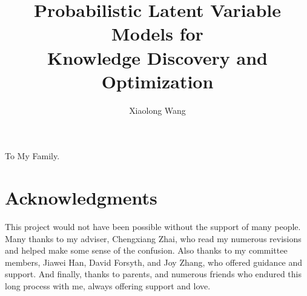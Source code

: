 \documentclass[edeposit,fullpage]{uiucthesis2009}
\theoremstyle{plain}
\theoremstyle{definition}
\theoremstyle{remark}
\begin{document}
\title{Probabilistic Latent Variable Models for  \\
  Knowledge Discovery and Optimization}
\author{Xiaolong Wang}
\phdthesis
{}
\maketitle

\frontmatter



\begin{dedication}
To My Family.
\end{dedication}

\chapter*{Acknowledgments}

This project would not have been possible without the support of many people.
Many thanks to my adviser, Chengxiang Zhai, who read my numerous revisions and
helped make some sense of the confusion. Also thanks to my committee members,
Jiawei Han, David Forsyth, and Joy Zhang, who offered guidance and support.  And
finally, thanks to parents, and numerous friends who endured this long process
with me, always offering support and love.

\end{document}
